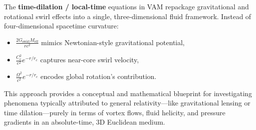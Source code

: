 The \textbf{time-dilation / local-time} equations in VAM repackage gravitational and rotational swirl effects into a single, three-dimensional fluid framework. Instead of four-dimensional spacetime curvature:
\begin{itemize}
    \item \(\tfrac{2 G_\text{swirl} M_\text{eff}}{r c^2}\) mimics Newtonian-style gravitational potential,
    \item \(\tfrac{C_e^2}{c^2} e^{-r/r_c}\) captures near-core swirl velocity,
    \item \(\tfrac{\Omega^2}{c^2} e^{-r/r_c}\) encodes global rotation's contribution.
\end{itemize}

This approach provides a conceptual and mathematical blueprint for investigating phenomena typically attributed to general relativity—like gravitational lensing or time dilation—purely in terms of vortex flows, fluid helicity, and pressure gradients in an absolute-time, 3D Euclidean medium.